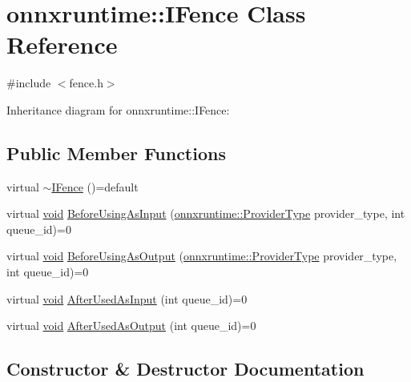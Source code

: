 \hypertarget{classonnxruntime_1_1IFence}{}\section{onnxruntime\+:\+:I\+Fence Class Reference}
\label{classonnxruntime_1_1IFence}


{\ttfamily \#include $<$fence.\+h$>$}



Inheritance diagram for onnxruntime\+:\+:I\+Fence\+:
\subsection*{Public Member Functions}
\begin{DoxyCompactItemize}
\item 
virtual \mbox{\hyperlink{classonnxruntime_1_1IFence_a837fce8da35142b2c6a419da00b66759}{$\sim$\+I\+Fence}} ()=default
\item 
virtual \mbox{\hyperlink{mlasi_8h_a88f941d423cb2a819b70a1358982b1a6}{void}} \mbox{\hyperlink{classonnxruntime_1_1IFence_aff95503bc94e36334887b7c8dbc1d14c}{Before\+Using\+As\+Input}} (\mbox{\hyperlink{namespaceonnxruntime_a863e2227cbf32aab76aad35fdadff4bb}{onnxruntime\+::\+Provider\+Type}} provider\+\_\+type, int queue\+\_\+id)=0
\item 
virtual \mbox{\hyperlink{mlasi_8h_a88f941d423cb2a819b70a1358982b1a6}{void}} \mbox{\hyperlink{classonnxruntime_1_1IFence_a0d93955cc57accb1a5e81b820fc9a7d5}{Before\+Using\+As\+Output}} (\mbox{\hyperlink{namespaceonnxruntime_a863e2227cbf32aab76aad35fdadff4bb}{onnxruntime\+::\+Provider\+Type}} provider\+\_\+type, int queue\+\_\+id)=0
\item 
virtual \mbox{\hyperlink{mlasi_8h_a88f941d423cb2a819b70a1358982b1a6}{void}} \mbox{\hyperlink{classonnxruntime_1_1IFence_af35eb555df9118afd4686e55f41b62a2}{After\+Used\+As\+Input}} (int queue\+\_\+id)=0
\item 
virtual \mbox{\hyperlink{mlasi_8h_a88f941d423cb2a819b70a1358982b1a6}{void}} \mbox{\hyperlink{classonnxruntime_1_1IFence_aa0d10e238e95cd8b7fed01c8c70fa1cd}{After\+Used\+As\+Output}} (int queue\+\_\+id)=0
\end{DoxyCompactItemize}


\subsection{Constructor \& Destructor Documentation}
\mbox{\label{classonnxruntime_1_1IFence_a837fce8da35142b2c6a419da00b66759}} 
